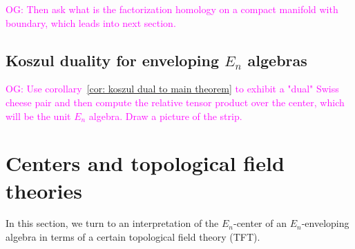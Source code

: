 \documentclass[11pt]{amsart}
\numberwithin{equation}{section}
\def\owen{\textcolor{magenta}{OG: }\textcolor{magenta}}
\begin{document}
\owen{Then ask what is the factorization homology on a compact manifold with boundary, which leads into next section.}

\subsection{Koszul duality for enveloping $E_n$ algebras}

\owen{Use corollary~\ref{cor: koszul dual to main theorem} to exhibit a "dual" Swiss cheese pair and then compute the relative tensor product over the center, which will be the unit $E_n$ algebra. Draw a picture of the strip.}

\section{Centers and topological field theories}
\label{sec: TFT}
%
%
%
%

In this section, we turn to an interpretation of the $E_n$-center of an $E_n$-enveloping algebra in terms of a certain topological field theory (TFT).
\end{document}

